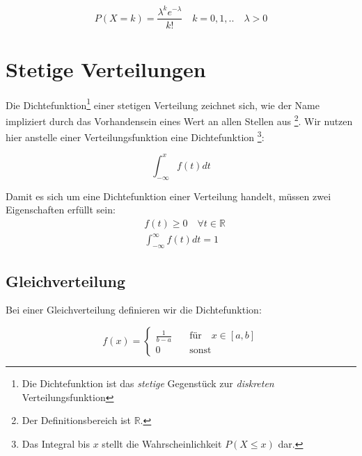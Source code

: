 \documentclass{tufte-handout}
\theoremstyle{own}
\begin{document}
\begin{equation}
	P(X = k) = \frac{\lambda^k e^{-\lambda}}{k!} \hspace{1em} k = 0,1,.. \hspace{1em} \lambda > 0
\end{equation}

\section{Stetige Verteilungen}

Die Dichtefunktion\footnote{Die Dichtefunktion ist das \textit{stetige} Gegenstück zur \textit{diskreten} Verteilungsfunktion}
einer stetigen Verteilung zeichnet sich, wie der Name impliziert durch das Vorhandensein eines Wert an allen Stellen aus
\footnote{Der Definitionsbereich ist $\mathbb{R}$.}. 
Wir nutzen hier anstelle einer Verteilungsfunktion eine Dichtefunktion
\footnote{Das Integral bis $x$ stellt die Wahrscheinlichkeit $P(X \leq x)$ dar.}:

\begin{equation}
	\int_{-\infty}^x f(t) dt 
\end{equation}

Damit es sich um eine Dichtefunktion einer Verteilung handelt, müssen zwei Eigenschaften erfüllt sein:
\begin{align}
&f(t) \geq 0 \hspace{1em} \forall t \in \mathbb{R} \label{dichteeig:1}\\
&\int_{-\infty}^{\infty} f(t) dt =1 \label{dichteeig:2}
\end{align}

\subsection{Gleichverteilung}

Bei einer Gleichverteilung definieren wir die Dichtefunktion:

\begin{equation}
f(x) = \begin{cases}
\frac{1}{b-a} \hspace{1em} &\text{für} \hspace{1em} x \in [a,b] \\
0 \hspace{1em} &\text{sonst}
\end{cases}
\end{equation}
\end{document}
